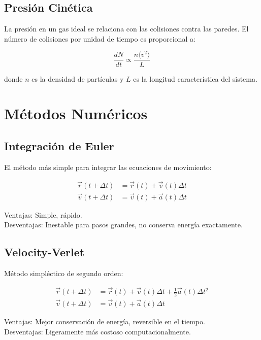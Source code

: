 \documentclass[12pt,a4paper]{article}
\begin{document}
\subsection{Presión Cinética}

La presión en un gas ideal se relaciona con las colisiones contra las paredes. El número de colisiones por unidad de tiempo es proporcional a:

\begin{equation}
\frac{dN}{dt} \propto \frac{n \langle v^2 \rangle}{L}
\end{equation}

donde $n$ es la densidad de partículas y $L$ es la longitud característica del sistema.

\section{Métodos Numéricos}

\subsection{Integración de Euler}

El método más simple para integrar las ecuaciones de movimiento:

\begin{align}
\vec{r}(t+\Delta t) &= \vec{r}(t) + \vec{v}(t) \Delta t \\
\vec{v}(t+\Delta t) &= \vec{v}(t) + \vec{a}(t) \Delta t
\end{align}

Ventajas: Simple, rápido. \\
Desventajas: Inestable para pasos grandes, no conserva energía exactamente.

\subsection{Velocity-Verlet}

Método simpléctico de segundo orden:

\begin{align}
\vec{r}(t+\Delta t) &= \vec{r}(t) + \vec{v}(t)\Delta t + \frac{1}{2}\vec{a}(t)\Delta t^2 \\
\vec{v}(t+\Delta t) &= \vec{v}(t) + \vec{a}(t)\Delta t
\end{align}

Ventajas: Mejor conservación de energía, reversible en el tiempo. \\
Desventajas: Ligeramente más costoso computacionalmente.
\end{document}
